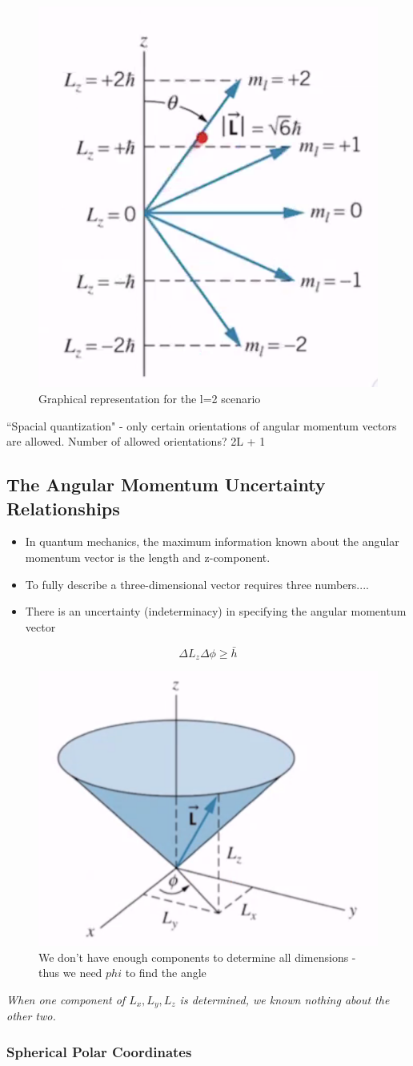 \documentclass[class=article,crop=false]{standalone}
\begin{document}
\begin{figure}[h!]
	\centering
	\includegraphics[width=0.2\linewidth]{./Images/l_equals_2.png}
	\caption{Graphical representation for the l=2 scenario}
\end{figure}

``Spacial quantization" - only certain orientations of angular momentum vectors are allowed. Number of allowed orientations? 2L + 1

\subsection{The Angular Momentum Uncertainty Relationships}

\begin{itemize}
	\item In quantum mechanics, the maximum information known about the angular momentum vector is the length and z-component.
	\item To fully describe a three-dimensional vector requires three numbers....
	\item There is an uncertainty (indeterminacy) in specifying the angular momentum vector
\end{itemize}

$$ \Delta L_z \Delta \phi \geq \bar{h} $$

\begin{figure}[h!]
	\centering
	\includegraphics[width=0.3\linewidth]{./Images/angular_2.png}
	\caption{We don't have enough components to determine all dimensions - thus we need $phi$ to find the angle}
\end{figure}

\emph{When one component of $L_x, L_y, L_z$ is determined, we known nothing about the other two.}

\subsubsection{Spherical Polar Coordinates}
\end{document}
